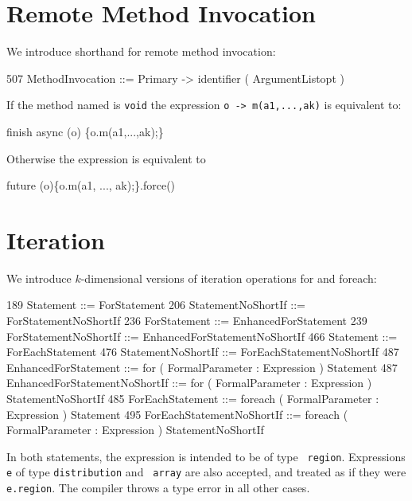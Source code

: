 {{\section{Remote Method Invocation}
We introduce shorthand for remote method invocation:

\begin{x10}
507   MethodInvocation ::= 
        Primary -> identifier ( ArgumentListopt )
\end{x10}

If the method named is {\tt void} the expression {\tt o -> m(a1,...,ak)}
is equivalent to:
\begin{x10}
 finish async (o) \{o.m(a1,...,ak);\}
\end{x10}

Otherwise the expression is equivalent to
\begin{x10}
 future (o)\{o.m(a1, ..., ak);\}.force()
\end{x10}

\section{Iteration}\label{ForLoop}
\label{ForAllLoop}

We introduce  $k$-dimensional versions of iteration operations {\cf for} and 
{\cf foreach}:

\begin{x10}
189 Statement ::= ForStatement
206 StatementNoShortIf ::= 
      ForStatementNoShortIf
236 ForStatement ::= EnhancedForStatement
239 ForStatementNoShortIf ::= 
      EnhancedForStatementNoShortIf
466 Statement ::= ForEachStatement
476 StatementNoShortIf ::= 
      ForEachStatementNoShortIf
487 EnhancedForStatement ::= 
       for ( FormalParameter : Expression ) 
         Statement
487 EnhancedForStatementNoShortIf ::= 
       for ( FormalParameter : Expression ) 
           StatementNoShortIf
485  ForEachStatement ::= 
       foreach ( FormalParameter : Expression ) 
           Statement
495  ForEachStatementNoShortIf ::= 
        foreach ( FormalParameter : Expression ) 
          StatementNoShortIf
\end{x10}

In both statements, the expression is intended to be of type {\tt
region}.  Expressions {\tt e} of type {\tt distribution} and {\tt
array} are also accepted, and treated as if they were {\tt
e.region}. The compiler throws a type error in all other cases.

}}
